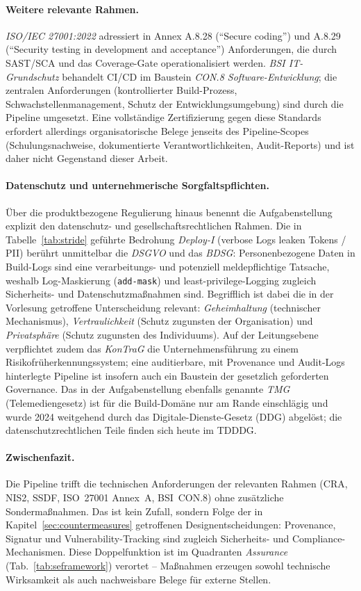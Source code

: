 \documentclass[12pt, a4paper]{scrartcl}
\begin{document}
\paragraph{Weitere relevante Rahmen.}
\emph{ISO/IEC 27001:2022} adressiert in Annex A.8.28
(\enquote{Secure coding}) und A.8.29 (\enquote{Security testing in
development and acceptance}) Anforderungen, die durch SAST/SCA und
das Coverage-Gate operationalisiert werden. \emph{BSI IT-Grundschutz}
behandelt CI/CD im Baustein \emph{CON.8 Software-Entwicklung}; die
zentralen Anforderungen (kontrollierter Build-Prozess,
Schwachstellen\-management, Schutz der Entwicklungs\-umgebung) sind
durch die Pipeline umgesetzt. Eine vollständige Zertifizierung gegen
diese Standards erfordert allerdings organisatorische Belege jenseits
des Pipeline-Scopes (Schulungs\-nachweise, dokumentierte
Verantwortlich\-keiten, Audit-Reports) und ist daher nicht Gegenstand
dieser Arbeit.

\paragraph{Datenschutz und unternehmerische Sorgfaltspflichten.}
Über die produktbezogene Regulierung hinaus benennt die
Aufgabenstellung explizit den datenschutz- und gesellschaftsrechtlichen
Rahmen. Die in Tabelle~\ref{tab:stride} geführte Bedrohung \emph{Deploy-I}
(verbose Logs leaken Tokens / PII) berührt unmittelbar die \emph{DSGVO}
und das \emph{BDSG}: Personenbezogene Daten in Build-Logs sind eine
verarbeitungs- und potenziell meldepflichtige Tatsache, weshalb
Log-Maskierung (\texttt{add-mask}) und least-privilege-Logging zugleich
Sicherheits- und Datenschutzmaßnahmen sind. Begrifflich ist dabei die in
der Vorlesung getroffene Unterscheidung relevant: \emph{Geheimhaltung}
(technischer Mechanismus), \emph{Vertraulichkeit} (Schutz zugunsten der
Organisation) und \emph{Privatsphäre} (Schutz zugunsten des Individuums).
Auf der Leitungsebene verpflichtet zudem das \emph{KonTraG} die
Unternehmensführung zu einem Risikofrüherkennungssystem; eine
auditierbare, mit Provenance und Audit-Logs hinterlegte Pipeline ist
insofern auch ein Baustein der gesetzlich geforderten Governance. Das in
der Aufgabenstellung ebenfalls genannte \emph{TMG} (Telemediengesetz) ist
für die Build-Domäne nur am Rande einschlägig und wurde 2024 weitgehend
durch das Digitale-Dienste-Gesetz (DDG) abgelöst; die
datenschutzrechtlichen Teile finden sich heute im TDDDG.

\paragraph{Zwischenfazit.}
Die Pipeline trifft die technischen Anforderungen der relevanten
Rahmen (CRA, NIS2, SSDF, ISO~27001 Annex~A, BSI~CON.8) ohne
zusätzliche Sondermaßnahmen. Das ist kein Zufall, sondern Folge der
in Kapitel~\ref{sec:countermeasures} getroffenen Designentscheidungen:
Provenance, Signatur und Vulnerability-Tracking sind zugleich
Sicherheits- und Compliance-Mechanismen. Diese Doppelfunktion ist im
Quadranten \emph{Assurance} (Tab.~\ref{tab:seframework}) verortet --
Maßnahmen erzeugen sowohl technische Wirksamkeit als auch
nachweisbare Belege für externe Stellen.
\end{document}
